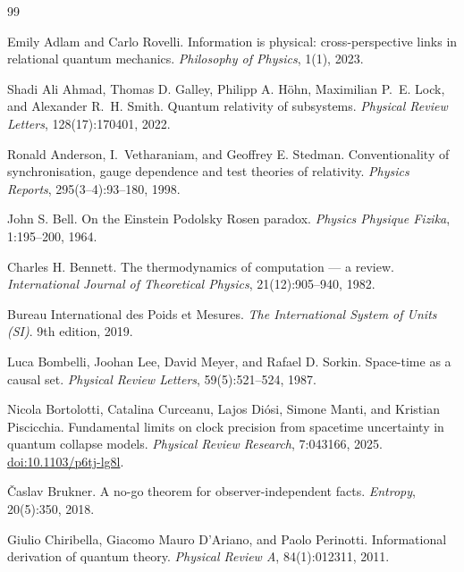 \documentclass[11pt,a4paper]{article}
\theoremstyle{remark}\newtheorem{remark}[definition]{Remark}
\begin{document}
\begin{thebibliography}{99}

Emily Adlam and Carlo Rovelli.
\newblock Information is physical: cross-perspective links in relational quantum mechanics.
\newblock \emph{Philosophy of Physics}, 1(1), 2023.

Shadi Ali Ahmad, Thomas D. Galley, Philipp A. H\"ohn, Maximilian P.~E. Lock, and Alexander R.~H. Smith.
\newblock Quantum relativity of subsystems.
\newblock \emph{Physical Review Letters}, 128(17):170401, 2022.

Ronald Anderson, I.~Vetharaniam, and Geoffrey E. Stedman.
\newblock Conventionality of synchronisation, gauge dependence and test theories of relativity.
\newblock \emph{Physics Reports}, 295(3--4):93--180, 1998.

John S. Bell.
\newblock On the Einstein Podolsky Rosen paradox.
\newblock \emph{Physics Physique Fizika}, 1:195--200, 1964.

Charles H. Bennett.
\newblock The thermodynamics of computation --- a review.
\newblock \emph{International Journal of Theoretical Physics}, 21(12):905--940, 1982.

Bureau International des Poids et Mesures.
\newblock \emph{The International System of Units (SI)}.
\newblock 9th edition, 2019.

Luca Bombelli, Joohan Lee, David Meyer, and Rafael D. Sorkin.
\newblock Space-time as a causal set.
\newblock \emph{Physical Review Letters}, 59(5):521--524, 1987.

Nicola Bortolotti, Catalina Curceanu, Lajos Di\'osi, Simone Manti, and Kristian Piscicchia.
\newblock Fundamental limits on clock precision from spacetime uncertainty in quantum collapse models.
\newblock \emph{Physical Review Research}, 7:043166, 2025.
\newblock \href{https://doi.org/10.1103/p6tj-lg8l}{doi:10.1103/p6tj-lg8l}.

\v{C}aslav Brukner.
\newblock A no-go theorem for observer-independent facts.
\newblock \emph{Entropy}, 20(5):350, 2018.

Giulio Chiribella, Giacomo Mauro D'Ariano, and Paolo Perinotti.
\newblock Informational derivation of quantum theory.
\newblock \emph{Physical Review A}, 84(1):012311, 2011.


\end{thebibliography}
\end{document}

